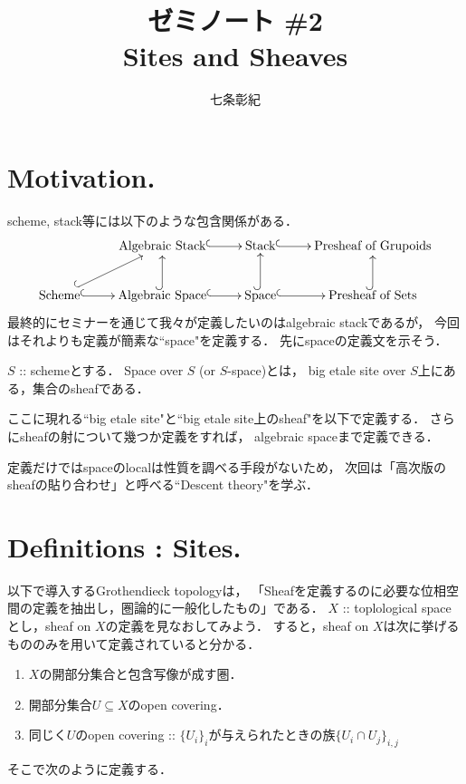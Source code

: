 \documentclass[a4paper]{jsarticle}
\begin{document}
\title{ゼミノート \#2 \\ Sites and Sheaves}
\author{七条彰紀}
\maketitle

\section{Motivation.}
scheme, stack等には以下のような包含関係がある．
\[\xymatrix{
    {} & \text{Algebraic Stack} \ar@{^{(}->}[r]& \text{Stack} \ar@{^{(}->}[r]& \text{Presheaf of Grupoids} \\
    \text{Scheme} \ar@{^{(}->}[r]\ar@{^{(}->}[ru]& \text{Algebraic Space} \ar@{^{(}->}[r]\ar@{^{(}->}[u]&
        \text{Space} \ar@{^{(}->}[r]\ar@{^{(}->}[u]& \text{Presheaf of Sets} \ar@{^{(}->}[u]
}\]
最終的にセミナーを通じて我々が定義したいのはalgebraic stackであるが，
今回はそれよりも定義が簡素な``space"を定義する．
先にspaceの定義文を示そう．

\begin{Def}
    $S$ :: schemeとする．
    Space over $S$ (or $S$-space)とは，
    big etale site over $S$上にある，集合のsheafである．
\end{Def}
ここに現れる``big etale site"と``big etale site上のsheaf"を以下で定義する．
さらにsheafの射について幾つか定義をすれば，
algebraic spaceまで定義できる．

定義だけではspaceのlocalは性質を調べる手段がないため，
次回は「高次版のsheafの貼り合わせ」と呼べる``Descent theory"を学ぶ．

\section{Definitions : Sites.}
以下で導入するGrothendieck topologyは，
「Sheafを定義するのに必要な位相空間の定義を抽出し，圏論的に一般化したもの」である．
$X$ :: toplological spaceとし，sheaf on $X$の定義を見なおしてみよう．
すると，sheaf on  $X$は次に挙げるもののみを用いて定義されていると分かる．
\begin{enumerate}
    \item $X$の開部分集合と包含写像が成す圏．
    \item 開部分集合$U \subseteq X$のopen covering．
    \item 同じく$U$のopen covering :: $\{U_i\}_i$が与えられたときの族$\{ U_i \cap U_j \}_{i,j}$
\end{enumerate}
そこで次のように定義する．
\end{document}
